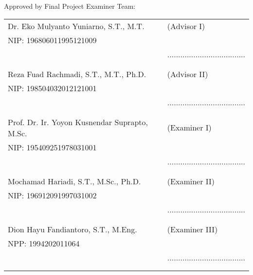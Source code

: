   \begin{center}
    Approved by Final Project Examiner Team:
  \end{center}


  \begingroup
    \setlength{\tabcolsep}{0pt}

    \noindent
    \begin{tabularx}{\textwidth}{X l}
      Dr. Eko Mulyanto Yuniarno, S.T., M.T.          & (Advisor I) \\
      NIP: 196806011995121009        & \\
      & ....................................\\
      &  \\
      &  \\
      Reza Fuad Rachmadi, S.T., M.T., Ph.D.     & (Advisor II) \\
      NIP: 198504032012121001        & \\
      & ....................................\\
      &  \\
      &  \\
      Prof. Dr. Ir. Yoyon Kusnendar Suprapto, M.Sc.               & (Examiner I) \\
      NIP: 195409251978031001 & \\
      & ....................................\\
      &  \\
      &  \\
      Mochamad Hariadi, S.T., M.Sc., Ph.D.              & (Examiner II) \\
      NIP: 196912091997031002 & \\
      & ....................................\\
      &  \\
      &  \\
      Dion Hayu Fandiantoro, S.T., M.Eng.             & (Examiner III) \\
      NPP: 1994202011064 & \\
      & ....................................\\
      &  \\
      &  \\
    \end{tabularx}
  \endgroup

